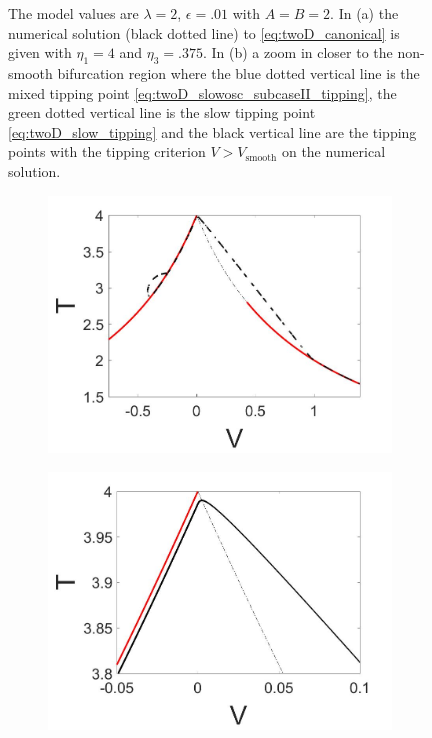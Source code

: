 \begin{figure}[H]
\begin{subfigure}{.5\textwidth}
 \caption{}
\end{subfigure}
\caption{The model values are $\lambda=2$, $\epsilon=.01$ with $A=B=2$. In (a) the numerical solution (black dotted line) to \eqref{eq:twoD_canonical} is given with $\eta_1=4$ and $\eta_3=.375$. In (b) a zoom in closer to the non-smooth bifurcation region where the blue dotted vertical line is the mixed tipping point \eqref{eq:twoD_slowosc_subcaseII_tipping}, the green dotted vertical line is the slow tipping point \eqref{eq:twoD_slow_tipping} and the black vertical line are the tipping points with the tipping criterion $V>V_{\text{smooth}}$ on the numerical solution.}
\label{fig:twoD_slowosc_Vnumerics_large}
\end{figure}

\begin{figure}[H]
\centering
\begin{subfigure}{.5\textwidth}
 \centering
 \includegraphics[width=\linewidth]{twoD/slowosc_Tplot_large.jpg}
 \caption{}
\end{subfigure}%
\begin{subfigure}{.5\textwidth}
 \centering
 \includegraphics[width=\linewidth]{twoD/slowosc_Tplot_large_zoom.jpg}

\end{subfigure}
\end{figure}
